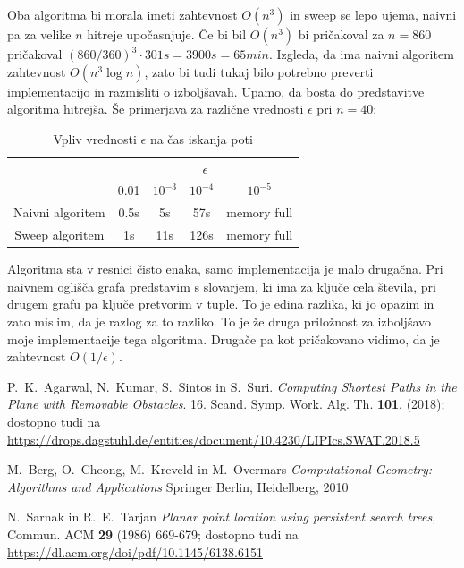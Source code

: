 \documentclass{article}
\begin{document}
Oba algoritma bi morala imeti zahtevnost $O(n^3)$ in sweep se lepo ujema, naivni pa za velike $n$ hitreje upočasnjuje. Če bi bil $O(n^3)$ bi pričakoval za $n = 860$ pričakoval $(860/360)^3 \cdot 301s = 3900s = 65min$. Izgleda, da ima naivni algoritem zahtevnost $O(n^3 \log n)$, zato bi tudi tukaj bilo potrebno preverti implementacijo in razmisliti o izboljšavah. Upamo, da bosta do predstavitve algoritma hitrejša. Še primerjava za različne vrednosti $\epsilon$ pri $n=40$:

\begin{table}[h]
    \centering
    \begin{tabular}{|c|c|c|c|c|}
        \hline
        & \multicolumn{4}{c|}{$\epsilon$} \\
        \cline{2-5}
        & 0.01 & $10^{-3}$ & $10^{-4}$ & $10^{-5}$ \\
        \hline
        Naivni algoritem & 0.5s & 5s &  57s & memory full \\
        \hline
        Sweep algoritem & 1s & 11s & 126s  &  memory full \\
        \hline
    \end{tabular}
    \caption{Vpliv vrednosti $\epsilon$ na čas iskanja poti}
    \label{tab:2}
\end{table}

Algoritma sta v resnici čisto enaka, samo implementacija je malo drugačna. Pri naivnem oglišča grafa predstavim s slovarjem, ki ima za ključe cela števila, pri drugem grafu pa ključe pretvorim v tuple. To je edina razlika, ki jo opazim in zato mislim, da je razlog za to razliko. To je že druga priložnost za izboljšavo moje implementacije tega algoritma. Drugače pa kot pričakovano vidimo, da je zahtevnost $O(1/\epsilon)$.


\begin{thebibliography}{99}

     P.~K.~Agarwal, N.~Kumar, S.~Sintos in S.~Suri. \emph{Computing Shortest Paths in the Plane with Removable Obstacles}. 16. Scand. Symp. Work. Alg. Th. \textbf{101}, (2018);
    dostopno tudi na \url{https://drops.dagstuhl.de/entities/document/10.4230/LIPIcs.SWAT.2018.5}


     M.~Berg, O.~Cheong, M.~Kreveld in  M.~Overmars \emph{Computational Geometry: Algorithms and Applications} Springer Berlin, Heidelberg, 2010

     N.~Sarnak in R.~E.~Tarjan \emph{Planar point location using persistent search trees}, Commun. ACM \textbf{29} (1986) 669-679; dostopno tudi na \url{https://dl.acm.org/doi/pdf/10.1145/6138.6151}

\end{thebibliography}
\end{document}
